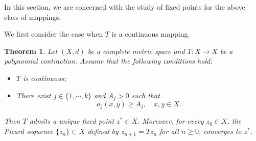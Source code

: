 \documentclass[letterpaper,12pt]{article}
\numberwithin{equation}{section}
\newtheorem{theorem}{Theorem}[section]
\theoremstyle{definition}
\theoremstyle{remark}
\begin{document}
In this section, we are concerned with the study of fixed points for the above class of mappings.

We first consider the case when $T$ is a continuous mapping. 

\begin{theorem}\label{T2.2}
Let $(X,d)$ be a complete metric space and $T: X\to X$ be a polynomial contraction. Assume that the following conditions hold:
\begin{itemize}
\item[{\rm{(i)}}]$T$ is continuous;
\item[{\rm{(ii)}}] There exist $j\in\{1,\cdots,k\}$ and 	$A_j>0$ such that 
$$
a_j(x,y)\geq A_j,\quad x,y\in X.
$$
\end{itemize}
Then $T$ admits a unique fixed point $z^*\in X$. Moreover, for every $z_0\in X$, the Picard sequence  $\{z_n\}\subset X$ defined by $z_{n+1}=Tz_n$ for all $n\geq 0$, converges to $z^*$. 
\end{theorem}
\end{document}
